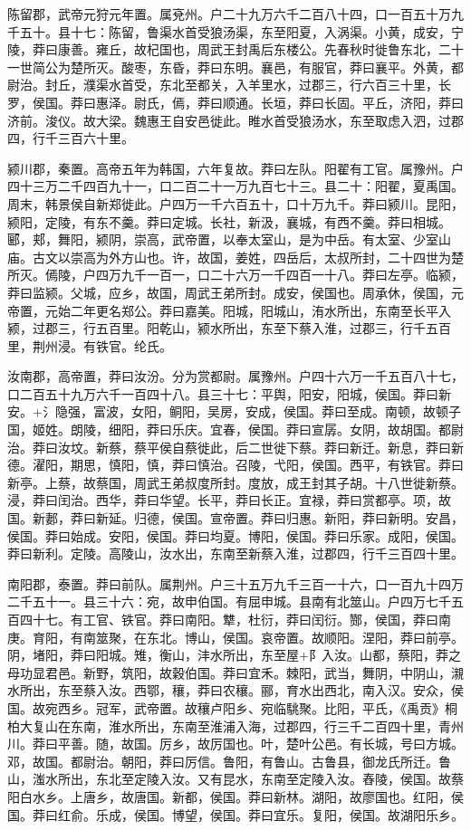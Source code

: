 \documentclass[12pt,UTF8]{ctexbook}
\begin{document}
陈留郡，武帝元狩元年置。属兗州。户二十九万六千二百八十四，口一百五十万九千五十。县十七：陈留，鲁渠水首受狼汤渠，东至阳夏，入涡渠。小黄，成安，宁陵，莽曰康善。雍丘，故杞国也，周武王封禹后东楼公。先春秋时徙鲁东北，二十一世简公为楚所灭。酸枣，东昏，莽曰东明。襄邑，有服官，莽曰襄平。外黄，都尉治。封丘，濮渠水首受，东北至都关，入羊里水，过郡三，行六百三十里，长罗，侯国。莽曰惠泽。尉氏，傿，莽曰顺通。长垣，莽曰长固。平丘，济阳，莽曰济前。浚仪。故大梁。魏惠王自安邑徙此。睢水首受狼汤水，东至取虑入泗，过郡四，行千三百六十里。



颍川郡，秦置。高帝五年为韩国，六年复故。莽曰左队。阳翟有工官。属豫州。户四十三万二千四百九十一，口二百二十一万九百七十三。县二十：阳翟，夏禹国。周末，韩景侯自新郑徙此。户四万一千六百五十，口十万九千。莽曰颍川。昆阳，颍阳，定陵，有东不羹。莽曰定城。长社，新汲，襄城，有西不羹。莽曰相城。郾，郏，舞阳，颍阴，崇高，武帝置，以奉太室山，是为中岳。有太室、少室山庙。古文以崇高为外方山也。许，故国，姜姓，四岳后，太叔所封，二十四世为楚所灭。傿陵，户四万九千一百一，口二十六万一千四百一十八。莽曰左亭。临颍，莽曰监颍。父城，应乡，故国，周武王弟所封。成安，侯国也。周承休，侯国，元帝置，元始二年更名郑公。莽曰嘉美。阳城，阳城山，洧水所出，东南至长平入颍，过郡三，行五百里。阳乾山，颍水所出，东至下蔡入淮，过郡三，行千五百里，荆州浸。有铁官。纶氏。



汝南郡，高帝置，莽曰汝汾。分为赏都尉。属豫州。户四十六万一千五百八十七，口二百五十九万六千一百四十八。县三十七：平舆，阳安，阳城，侯国。莽曰新安。+氵隐强，富波，女阳，鲖阳，吴房，安成，侯国。莽曰至成。南顿，故顿子国，姬姓。朗陵，细阳，莽曰乐庆。宜春，侯国。莽曰宣孱。女阴，故胡国。都尉治。莽曰汝坟。新蔡，蔡平侯自蔡徙此，后二世徙下蔡。莽曰新迁。新息，莽曰新德。濯阳，期思，慎阳，慎，莽曰慎治。召陵，弋阳，侯国。西平，有铁官。莽曰新亭。上蔡，故蔡国，周武王弟叔度所封。度放，成王封其子胡。十八世徙新蔡。浸，莽曰闰治。西华，莽曰华望。长平，莽曰长正。宜禄，莽曰赏都亭。项，故国。新郪，莽曰新延。归德，侯国。宣帝置。莽曰归惠。新阳，莽曰新明。安昌，侯国。莽曰始成。安阳，侯国。莽曰均夏。博阳，侯国。莽曰乐家。成阳，侯国。莽曰新利。定陵。高陵山，汝水出，东南至新蔡入淮，过郡四，行千三百四十里。



南阳郡，泰置。莽曰前队。属荆州。户三十五万九千三百一十六，口一百九十四万二千五十一。县三十六：宛，故申伯国。有屈申城。县南有北筮山。户四万七千五百四十七。有工官、铁官。莽曰南阳。犨，杜衍，莽曰闰衍。酂，侯国，莽曰南庚。育阳，有南筮聚，在东北。博山，侯国。哀帝置。故顺阳。涅阳，莽曰前亭。阴，堵阳，莽曰阳城。雉，衡山，沣水所出，东至屋+阝入汝。山都，蔡阳，莽之母功显君邑。新野，筑阳，故穀伯国。莽曰宜禾。棘阳，武当，舞阴，中阴山，瀙水所出，东至蔡入汝。西鄂，穰，莽曰农穰。郦，育水出西北，南入汉。安众，侯国。故宛西乡。冠军，武帝置。故穰卢阳乡、宛临駣聚。比阳，平氏，《禹贡》桐柏大复山在东南，淮水所出，东南至淮浦入海，过郡四，行三千二百四十里，青州川。莽曰平善。随，故国。厉乡，故厉国也。叶，楚叶公邑。有长城，号曰方城。邓，故国。都尉治。朝阳，莽曰厉信。鲁阳，有鲁山。古鲁县，御龙氏所迁。鲁山，滍水所出，东北至定陵入汝。又有昆水，东南至定陵入汝。舂陵，侯国。故蔡阳白水乡。上唐乡，故唐国。新都，侯国。莽曰新林。湖阳，故廖国也。红阳，侯国。莽曰红俞。乐成，侯国。博望，侯国。莽曰宜乐。复阳，侯国。故湖阳乐乡。
\end{document}
